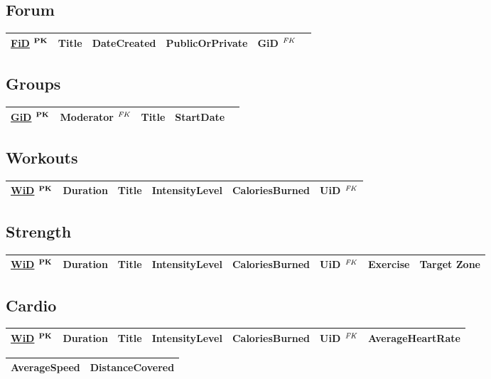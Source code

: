 \documentclass{article}
\newcommand{\pk}{$^{\text{\textbf{PK}}}$}
\newcommand{\fk}{$^{\text{\textit{FK}}}$}
\begin{document}
\subsection*{Forum}
\begin{tabular}{|l|l|l|l|l|l|}
\hline
\underline{FiD} \pk & Title & DateCreated & PublicOrPrivate & GiD \fk \\
\hline
\end{tabular}

\subsection*{Groups}
\begin{tabular}{|l|l|l|l|l|}
\hline
\underline{GiD} \pk & Moderator \fk & Title & StartDate  \\
\hline
\end{tabular}

\subsection*{Workouts}
\begin{tabular}{|l|l|l|l|l|l|}
\hline
\underline{WiD} \pk & Duration & Title & IntensityLevel & CaloriesBurned & UiD \fk \\
\hline
\end{tabular}

\subsection*{Strength}
\begin{tabular}{|l|l|l|l|l|l|l|l|}
\hline
\underline{WiD} \pk & Duration & Title & IntensityLevel & CaloriesBurned & UiD \fk & Exercise & Target Zone \\
\hline
\end{tabular}

\subsection*{Cardio}
\begin{tabular}{|l|l|l|l|l|l|l|}
\hline
\underline{WiD} \pk & Duration & Title & IntensityLevel & CaloriesBurned & UiD \fk & AverageHeartRate \\
\hline
\end{tabular}
\begin{tabular}{|l|l|}
\hline
AverageSpeed & DistanceCovered \\
\hline
\end{tabular}
\end{document}
